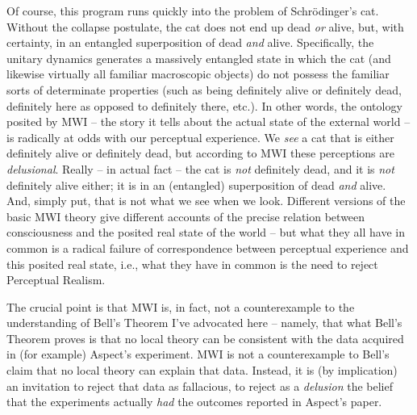 \documentclass[12pt]{article}
\begin{document}
Of course, this program runs quickly into the problem of
Schr\"odinger's cat.  Without the collapse postulate, the cat does not
end up dead \emph{or} alive, but, with certainty, in an entangled
superposition of dead \emph{and}
alive.  Specifically, the unitary dynamics generates a massively
entangled state in which the cat (and likewise virtually all familiar
macroscopic objects) do not possess the familiar sorts of determinate
properties (such as being definitely alive or definitely dead,
definitely here as opposed to definitely there, etc.).  In other
words, the ontology posited by MWI -- the story it tells about the
actual state of the external world -- is radically at odds with our
perceptual experience.  We \emph{see} a cat that is either definitely
alive or definitely dead, but according to MWI these perceptions are
\emph{delusional}.  Really -- in actual fact -- the cat is \emph{not}
definitely dead, and it is \emph{not} definitely alive either; it is
in an (entangled) superposition of dead \emph{and} alive.  And, simply
put, that is not what we see when we look.  Different versions of the
basic MWI theory \cite{albertmwi}
give different accounts of the precise relation
between consciousness and the posited real state of the world -- but what they
all have in common is a radical failure of correspondence between
perceptual experience and this posited real state, i.e., what they have in
common is the need to reject Perceptual Realism.

The crucial point is that MWI is, in fact, not a counterexample to the
understanding of Bell's Theorem I've advocated here -- namely, that
what Bell's Theorem proves is that no local theory can be
consistent with the data acquired in (for example) Aspect's
experiment.  MWI is not a counterexample to Bell's claim that no
local theory can explain that data.  Instead, it is (by implication) 
an invitation to reject that data as fallacious, to reject 
as a \emph{delusion} the belief that the experiments actually 
\emph{had} the outcomes reported in Aspect's paper.  
\end{document}
